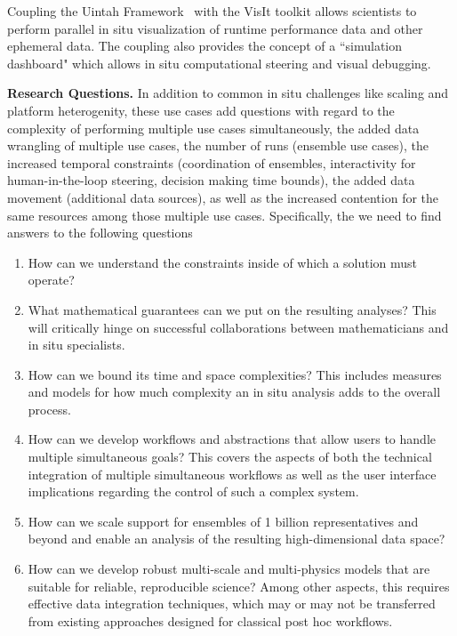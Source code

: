 \begin{refsection}
Coupling the Uintah Framework~\cite{Meng12} with the VisIt toolkit allows scientists to perform parallel in situ visualization of runtime performance data and other ephemeral data. The coupling also provides the concept of a “simulation dashboard" which allows in situ computational steering and visual debugging.

\medskip\noindent
\textbf{\sffamily Research Questions.} 
In addition to common in situ challenges like scaling and platform heterogenity, these use cases add questions with regard to the complexity of performing multiple use cases simultaneously, the added data wrangling of multiple use cases, the number of runs (ensemble use cases), the increased temporal constraints (coordination of ensembles, interactivity for human-in-the-loop steering, decision making time bounds), the added data movement (additional data sources), as well as the increased contention for the same resources among those multiple use cases.
Specifically, the we need to find answers to the following questions
\begin{enumerate}
    \item How can we understand the constraints inside of which a solution must operate? 
    \item What mathematical guarantees can we put on the resulting analyses?  This will critically hinge on successful collaborations between mathematicians and in situ specialists.
    \item How can we bound its time and space complexities? This includes measures and models for how much complexity an in situ analysis adds to the overall process.
    \item How can we develop workflows and abstractions that allow users to handle multiple simultaneous goals? This covers the aspects of both the technical integration of multiple simultaneous workflows as well as the user interface implications regarding the control of such a complex system.
    \item How can we scale support for ensembles of 1 billion representatives and beyond and enable an analysis of the resulting high-dimensional data space?
    \item How can we develop robust multi-scale and multi-physics models that are suitable for reliable, reproducible science? Among other aspects, this requires effective data integration techniques, which may or may not be transferred from existing approaches designed for classical post hoc workflows.
\end{enumerate}

\printbibliography
\end{refsection}

